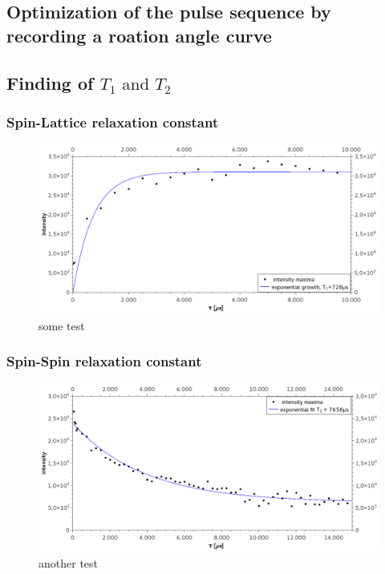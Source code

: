          
    \subsection{Optimization of the pulse sequence by recording a roation angle curve}
    \label{task_3}
    
    \subsection{Finding of $T_1 \text{ and } T_2$}
    \label{task_4}
        \subsubsection{Spin-Lattice relaxation constant}
            \begin{figure}[h]
                \centering
                \includegraphics[scale=0.3]{pic/T1.png}
                \caption{some test}
                \label{T1}
            \end{figure}
        \subsubsection{Spin-Spin relaxation constant}
            \begin{figure}
                \centering
                \includegraphics[scale=0.3]{pic/T2.png}
                \caption{another test}
                \label{T2}
            \end{figure}
    
